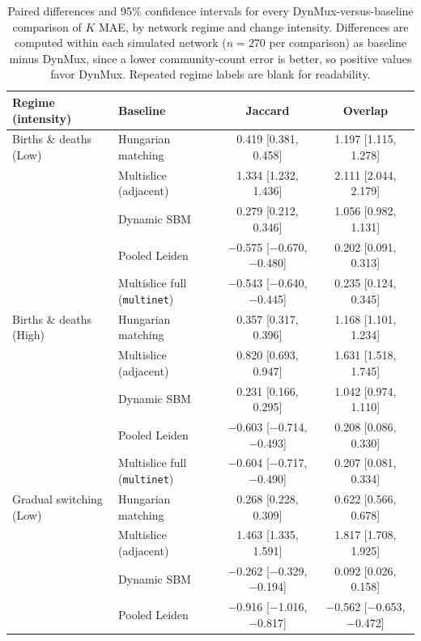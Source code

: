 \documentclass[11pt, letterpaper]{article}
\numberwithin{equation}{section}
\begin{document}
\begin{table}[htbp]
\centering
\singlespacing
\scriptsize
\setlength{\tabcolsep}{4pt}
\caption{Paired differences and 95\% confidence intervals for every
DynMux-versus-baseline comparison of $K$ MAE, by network regime and change
intensity. Differences are computed within each simulated network
($n = 270$ per comparison) as baseline minus DynMux, since a lower
community-count error is better, so positive values favor DynMux.
Repeated regime labels are blank for readability.}
\label{tab:app_paired_ci_kmae}
\begin{tabular}{llcc}
\toprule
Regime (intensity) & Baseline & Jaccard & Overlap \\
\midrule
Births \& deaths (Low) & Hungarian matching & 0.419 [0.381, 0.458] & 1.197 [1.115, 1.278] \\
 & Multislice (adjacent) & 1.334 [1.232, 1.436] & 2.111 [2.044, 2.179] \\
 & Dynamic SBM & 0.279 [0.212, 0.346] & 1.056 [0.982, 1.131] \\
 & Pooled Leiden & $-$0.575 [$-$0.670, $-$0.480] & 0.202 [0.091, 0.313] \\
 & Multislice full (\texttt{multinet}) & $-$0.543 [$-$0.640, $-$0.445] & 0.235 [0.124, 0.345] \\
Births \& deaths (High) & Hungarian matching & 0.357 [0.317, 0.396] & 1.168 [1.101, 1.234] \\
 & Multislice (adjacent) & 0.820 [0.693, 0.947] & 1.631 [1.518, 1.745] \\
 & Dynamic SBM & 0.231 [0.166, 0.295] & 1.042 [0.974, 1.110] \\
 & Pooled Leiden & $-$0.603 [$-$0.714, $-$0.493] & 0.208 [0.086, 0.330] \\
 & Multislice full (\texttt{multinet}) & $-$0.604 [$-$0.717, $-$0.490] & 0.207 [0.081, 0.334] \\
Gradual switching (Low) & Hungarian matching & 0.268 [0.228, 0.309] & 0.622 [0.566, 0.678] \\
 & Multislice (adjacent) & 1.463 [1.335, 1.591] & 1.817 [1.708, 1.925] \\
 & Dynamic SBM & $-$0.262 [$-$0.329, $-$0.194] & 0.092 [0.026, 0.158] \\
 & Pooled Leiden & $-$0.916 [$-$1.016, $-$0.817] & $-$0.562 [$-$0.653, $-$0.472] \\

\end{tabular}
\end{table}
\end{document}
